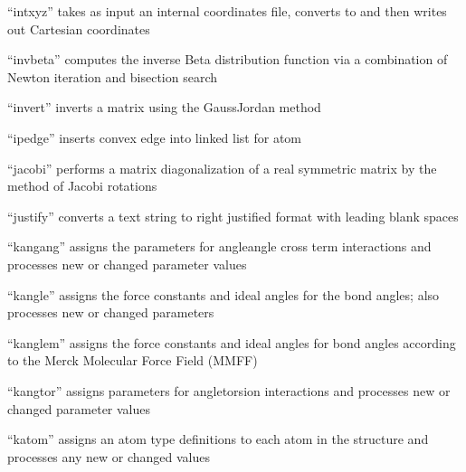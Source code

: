 \documentclass[letterpaper,11pt,english]{sphinxmanual}
\begin{document}
\sphinxAtStartPar
“intxyz” takes as input an internal coordinates file, converts to and then writes out Cartesian coordinates

\sphinxAtStartPar
{}

\sphinxAtStartPar
“invbeta” computes the inverse Beta distribution function via a combination of Newton iteration and bisection search

\sphinxAtStartPar
{}

\sphinxAtStartPar
“invert” inverts a matrix using the Gauss\sphinxhyphen{}Jordan method

\sphinxAtStartPar
{}

\sphinxAtStartPar
“ipedge” inserts convex edge into linked list for atom

\sphinxAtStartPar
{}

\sphinxAtStartPar
“jacobi” performs a matrix diagonalization of a real symmetric matrix by the method of Jacobi rotations

\sphinxAtStartPar
{}

\sphinxAtStartPar
“justify” converts a text string to right justified format with leading blank spaces

\sphinxAtStartPar
{}

\sphinxAtStartPar
“kangang” assigns the parameters for angle\sphinxhyphen{}angle cross term interactions and processes new or changed parameter values

\sphinxAtStartPar
{}

\sphinxAtStartPar
“kangle” assigns the force constants and ideal angles for the bond angles; also processes new or changed parameters

\sphinxAtStartPar
{}

\sphinxAtStartPar
“kanglem” assigns the force constants and ideal angles for bond angles according to the Merck Molecular Force Field (MMFF)

\sphinxAtStartPar
{}

\sphinxAtStartPar
“kangtor” assigns parameters for angle\sphinxhyphen{}torsion interactions and processes new or changed parameter values

\sphinxAtStartPar
{}

\sphinxAtStartPar
“katom” assigns an atom type definitions to each atom in the structure and processes any new or changed values
\end{document}
